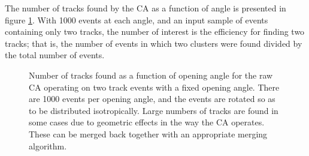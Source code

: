 The number of tracks found by the \ac{CA} as a function of angle is presented in figure \ref{fig:ca_toy_raw_trackcounts}. With 1000 events at each angle, and an input sample of events containing only two tracks, the number of interest is the efficiency for finding two tracks; that is, the number of events in which two clusters were found divided by the total number of events.%


\begin{figure}
\centering
\caption[Track count as a function of angle for raw CA operating on toy MC events]{\label{fig:ca_toy_raw_trackcounts}Number of tracks found as a function of opening angle for the raw \ac{CA} operating on two track events with a fixed opening angle. There are 1000 events per opening angle, and the events are rotated so as to be distributed isotropically. Large numbers of tracks are found in some cases due to geometric effects in the way the \ac{CA} operates. These can be merged back together with an appropriate merging algorithm.}
\end{figure}

